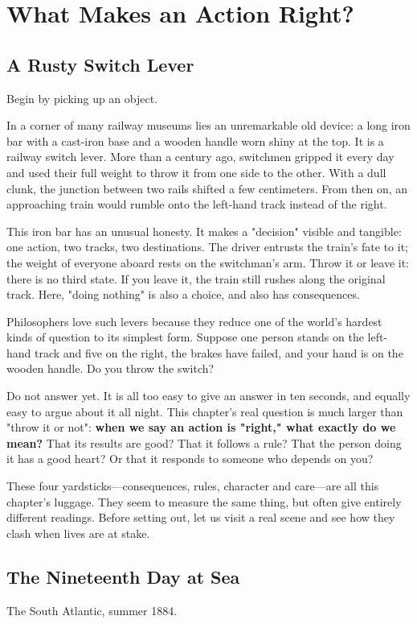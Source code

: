 \chapter{What Makes an Action Right?}
\section{A Rusty Switch Lever}
Begin by picking up an object.

In a corner of many railway museums lies an unremarkable old device: a long iron bar with a cast-iron base and a wooden handle worn shiny at the top. It is a railway switch lever. More than a century ago, switchmen gripped it every day and used their full weight to throw it from one side to the other. With a dull clunk, the junction between two rails shifted a few centimeters. From then on, an approaching train would rumble onto the left-hand track instead of the right.

This iron bar has an unusual honesty. It makes a "decision" visible and tangible: one action, two tracks, two destinations. The driver entrusts the train's fate to it; the weight of everyone aboard rests on the switchman's arm. Throw it or leave it: there is no third state. If you leave it, the train still rushes along the original track. Here, "doing nothing" is also a choice, and also has consequences.

Philosophers love such levers because they reduce one of the world's hardest kinds of question to its simplest form. Suppose one person stands on the left-hand track and five on the right, the brakes have failed, and your hand is on the wooden handle. Do you throw the switch?

Do not answer yet. It is all too easy to give an answer in ten seconds, and equally easy to argue about it all night. This chapter's real question is much larger than "throw it or not": \textbf{when we say an action is "right," what exactly do we mean?} That its results are good? That it follows a rule? That the person doing it has a good heart? Or that it responds to someone who depends on you?

These four yardsticks---consequences, rules, character and care---are all this chapter's luggage. They seem to measure the same thing, but often give entirely different readings. Before setting out, let us visit a real scene and see how they clash when lives are at stake.

\section{The Nineteenth Day at Sea}
The South Atlantic, summer 1884.

